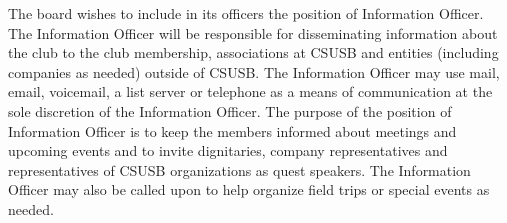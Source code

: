 \documentclass{article}
\begin{document}
  The board wishes to include in its officers the position of Information Officer. The Information Officer will be responsible for disseminating information about the club to the club membership, associations at CSUSB and entities (including companies as needed) outside of CSUSB.  The Information Officer may use mail, email, voicemail, a list server or telephone as a means of communication at the sole discretion of the Information Officer. The purpose of the position of Information Officer is to keep the members informed about meetings and upcoming events and to invite dignitaries, company representatives and representatives of CSUSB organizations as quest speakers.  The Information Officer may also be called upon to help organize field trips or special events as needed.
\end{document}
